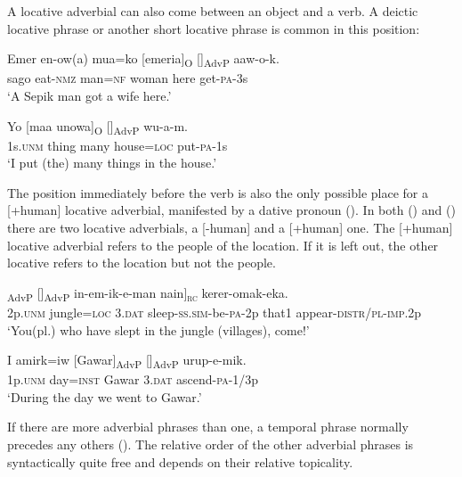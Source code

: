A locative adverbial can also come between an object  and a verb. A deictic locative phrase or another short locative phrase is common in this position:

\ea%
\label{ex:x914}
\gll Emer  en-ow(a)  mua=ko  [emeria]\textsubscript{O}  []\textsubscript{AdvP}  aaw-o-k. \\
     sago  eat-\textsc{nmz}  man=\textsc{nf}  woman  here  get-\textsc{pa}-3s \\
\glt `A Sepik man got a wife here.'
\z

\ea%
\label{ex:x931}
\gll Yo  [maa  unowa]\textsubscript{O}  []\textsubscript{AdvP}  wu-a-m. \\
     1s.\textsc{unm}  thing  many  house=\textsc{loc}  put-\textsc{pa}-1s \\
\glt `I put (the) many things in the house.'
\z

The position immediately before the verb is also the only possible place for a [+human] locative adverbial, manifested by a dative pronoun (). In both () and () there are two locative adverbials, a [-human] and a [+human] one. The [+human] locative adverbial refers to the people of the location. If it is left out, the other locative refers to the location but not the people. 

\ea%
\label{ex:x854}
\gll [Ni  [koka-pa]\textsubscript{AdvP}  []\textsubscript{AdvP}  in-em-ik-e-man nain]\textsubscript{\textsc{rc}} kerer-omak-eka. \\
     2p.\textsc{unm}  jungle=\textsc{loc}  3.\textsc{dat}  sleep-\textsc{ss}.\textsc{sim}-be-\textsc{pa}-2p that1 appear-\textsc{distr}/\textsc{pl}-\textsc{imp}.2p \\
\glt `You(pl.) who have slept in the jungle (villages), come!' 
\z

\ea%
\label{ex:x855}
\gll I  amirk=iw  [Gawar]\textsubscript{AdvP}  []\textsubscript{AdvP}  urup-e-mik. \\
     1p.\textsc{unm}  day=\textsc{inst}  Gawar  3.\textsc{dat}  ascend-\textsc{pa}-1/3p \\
\glt `During the day we went to Gawar.'
\z

If there are more adverbial phrases than one, a temporal phrase normally precedes any others ().  The relative order of the other adverbial phrases is syntactically quite free and depends on their relative topicality.

